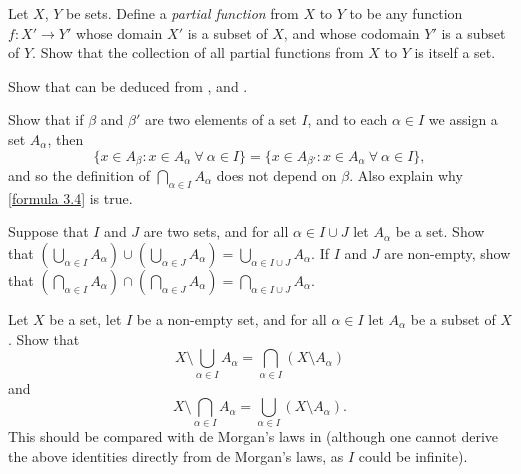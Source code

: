 \begin{exercise} \label{exercise 3.4.7}
Let \(X\), \(Y\) be sets.
Define a \emph{partial function} from \(X\) to \(Y\) to be any function \(f : X' \to Y'\) whose domain \(X'\) is a subset of \(X\), and whose codomain \(Y'\) is a subset of \(Y\).
Show that the collection of all partial functions from \(X\) to \(Y\) is itself a set.
\end{exercise}

\begin{exercise} \label{exercise 3.4.8}
Show that  can be deduced from ,  and .
\end{exercise}

\begin{exercise} \label{exercise 3.4.9}
Show that if \(\beta\) and \(\beta'\) are two elements of a set \(I\), and to each \(\alpha \in I\) we assign a set \(A_{\alpha}\), then
\[
    \{x \in A_{\beta} : x \in A_{\alpha} \ \forall\ \alpha \in I\} = \{x \in A_{\beta'} : x \in A_{\alpha} \ \forall\ \alpha \in I\},
\]
and so the definition of \(\bigcap_{\alpha \in I} A_{\alpha}\) does not depend on \(\beta\).
Also explain why \ref{formula 3.4} is true.
\end{exercise}

\begin{exercise} \label{exercise 3.4.10}
Suppose that \(I\) and \(J\) are two sets, and for all \(\alpha \in I \cup J\) let \(A_{\alpha}\) be a set.
Show that \((\bigcup_{\alpha \in I} A_{\alpha}) \cup (\bigcup_{\alpha \in J} A_{\alpha}) = \bigcup_{\alpha \in I \cup J} A_{\alpha}\).
If \(I\) and \(J\) are non-empty, show that \((\bigcap_{\alpha \in I} A_{\alpha}) \cap (\bigcap_{\alpha \in J} A_{\alpha}) = \bigcap_{\alpha \in I \cup J} A_{\alpha}\).
\end{exercise}

\begin{exercise} \label{exercise 3.4.11}
Let \(X\) be a set, let \(I\) be a non-empty set, and for all \(\alpha \in I\) let \(A_{\alpha}\) be a subset of \(X\).
Show that
\[
    X \setminus \bigcup_{\alpha \in I} A_{\alpha} = \bigcap_{\alpha \in I} (X \setminus A_{\alpha})
\]
and
\[
    X \setminus \bigcap_{\alpha \in I} A_{\alpha} = \bigcup_{\alpha \in I} (X \setminus A_{\alpha}).
\]
This should be compared with de Morgan’s laws in 
(although one cannot derive the above identities directly from de Morgan’s laws, as \(I\) could be infinite).
\end{exercise}